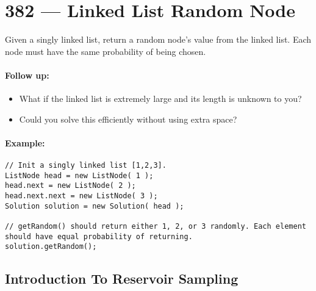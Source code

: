 \section{382 --- Linked List Random Node}
Given a singly linked list, return a random node's value from the linked list. Each node must have the same probability of being chosen.

\paragraph{Follow up:}
\begin{itemize}
\item What if the linked list is extremely large and its length is unknown to you? 
\item Could you solve this efficiently without using extra space?
\end{itemize}

\paragraph{Example:}

\begin{lstlisting}[style=customc]
// Init a singly linked list [1,2,3].
ListNode head = new ListNode( 1 );
head.next = new ListNode( 2 );
head.next.next = new ListNode( 3 );
Solution solution = new Solution( head );

// getRandom() should return either 1, 2, or 3 randomly. Each element should have equal probability of returning.
solution.getRandom();
\end{lstlisting}

\subsection{Introduction To Reservoir Sampling}

